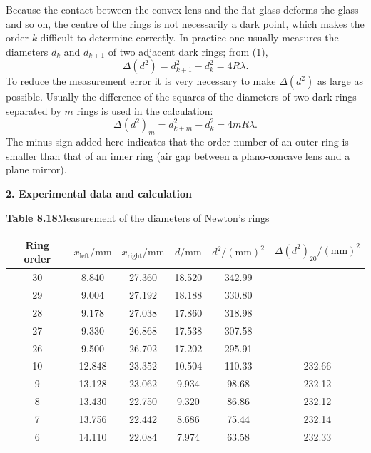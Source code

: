 Because the contact between the convex lens and the flat glass deforms the glass and so on, the centre of the rings is not necessarily a dark point, which makes the order $k$ difficult to determine correctly. In practice one usually measures the diameters $d_k$ and $d_{k+1}$ of two adjacent dark rings; from (1),
\begin{equation}
\Delta(d^2)=d_{k+1}^2-d_k^2=4R\lambda. \tag{2}
\end{equation}
To reduce the measurement error it is very necessary to make $\Delta(d^2)$ as large as possible. Usually the difference of the squares of the diameters of two dark rings separated by $m$ rings is used in the calculation:
\begin{equation}
\Delta(d^2)_m=d_{k+m}^2-d_k^2=4mR\lambda. \tag{3}
\end{equation}
The minus sign added here indicates that the order number of an outer ring is smaller than that of an inner ring (air gap between a plano-concave lens and a plane mirror).

\textbf{2. Experimental data and calculation}

\begin{center}
\textbf{Table 8.18}\quad Measurement of the diameters of Newton's rings\\[3pt]
\begin{tabular}{cccccc}
\toprule
Ring order & $x_{\text{left}}/\mathrm{mm}$ & $x_{\text{right}}/\mathrm{mm}$ & $d/\mathrm{mm}$ & $d^2/(\mathrm{mm})^2$ & $\Delta(d^2)_{20}/(\mathrm{mm})^2$ \\
\midrule
30 & 8.840 & 27.360 & 18.520 & 342.99 & \\
29 & 9.004 & 27.192 & 18.188 & 330.80 & \\
28 & 9.178 & 27.038 & 17.860 & 318.98 & \\
27 & 9.330 & 26.868 & 17.538 & 307.58 & \\
26 & 9.500 & 26.702 & 17.202 & 295.91 & \\
\midrule
10 & 12.848 & 23.352 & 10.504 & 110.33 & 232.66 \\
9 & 13.128 & 23.062 & 9.934 & 98.68 & 232.12 \\
8 & 13.430 & 22.750 & 9.320 & 86.86 & 232.12 \\
7 & 13.756 & 22.442 & 8.686 & 75.44 & 232.14 \\
6 & 14.110 & 22.084 & 7.974 & 63.58 & 232.33 \\
\bottomrule
\end{tabular}
\end{center}

